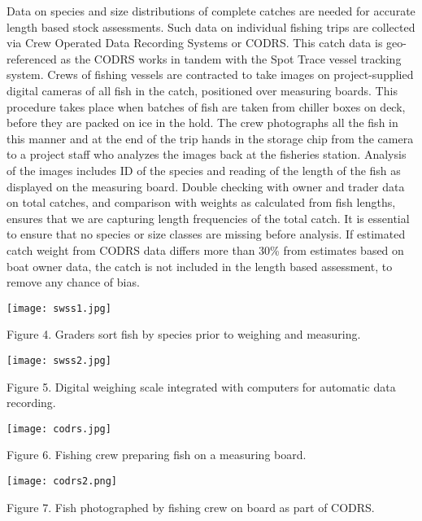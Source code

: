 Data on species and size distributions of complete catches are needed for accurate length based stock assessments. Such data on individual fishing trips are collected via Crew Operated Data Recording Systems or CODRS. This catch data is geo-referenced as the CODRS works in tandem with the Spot Trace vessel tracking system. Crews of fishing vessels are contracted to take images on project-supplied digital cameras of all fish in the catch, positioned over measuring boards. This procedure takes place when batches of fish are taken from chiller boxes on deck, before they are packed on ice in the hold. The crew photographs all the fish in this manner and at the end of the trip hands in the storage chip from the camera to a project staff who analyzes the images back at the fisheries station. Analysis of the images includes ID of the species and reading of the length of the fish as displayed on the measuring board. Double checking with owner and trader data on total catches, and comparison with weights as calculated from fish lengths, ensures that we are capturing length frequencies of the total catch. It is essential to ensure that no species or size classes are missing before analysis. If estimated catch weight from CODRS data differs more than 30\% from estimates based on boat owner data, the catch is not included in the length based assessment, to remove any chance of bias.

\begin{center}
\graphicspath{{/root/R-project/IFishSnapperWPP714_715/Images/}}
\texttt{[image: swss1.jpg]}

Figure 4. Graders sort fish by species prior to weighing and measuring.
\end{center}

\begin{center}
\graphicspath{{/root/R-project/IFishSnapperWPP714_715/Images/}}
\texttt{[image: swss2.jpg]}

Figure 5. Digital weighing scale integrated with computers for automatic data recording.
\end{center}

\begin{center}
\graphicspath{{/root/R-project/IFishSnapperWPP714_715/Images/}}
\texttt{[image: codrs.jpg]}

Figure 6. Fishing crew preparing fish on a measuring board.
\end{center}

\begin{center}
\graphicspath{{/root/R-project/IFishSnapperWPP714_715/Images/}}
\texttt{[image: codrs2.png]}

Figure 7. Fish photographed by fishing crew on board as part of CODRS.
\end{center}

